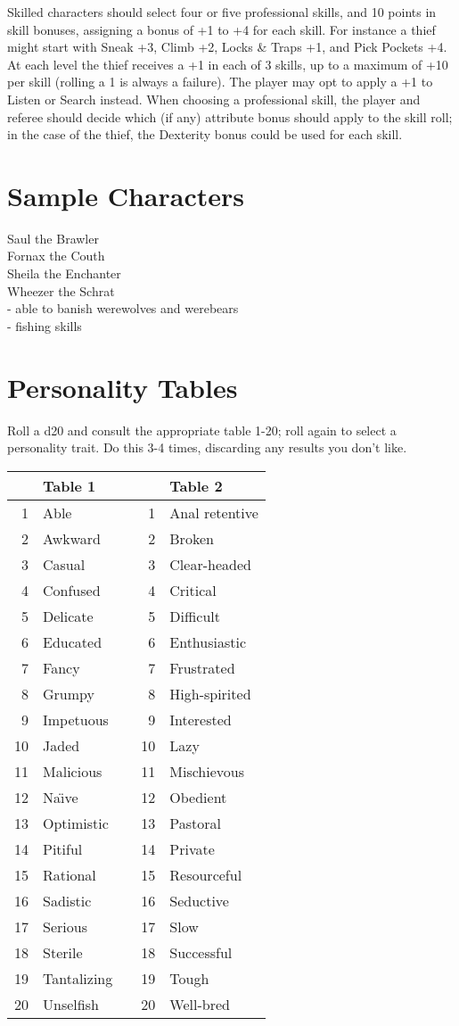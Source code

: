 \documentclass[12pt]{article}
\begin{document}
Skilled characters should select four or five professional skills, and
10 points in skill bonuses, assigning a bonus of +1 to +4 for each
skill. For instance a thief might start with Sneak +3, Climb +2, Locks
\& Traps +1, and Pick Pockets +4. At each level the thief receives a +1
in each of 3 skills, up to a maximum of +10 per skill (rolling a 1 is
always a failure). The player may opt to apply a +1 to Listen or
Search instead. When choosing a professional skill, the player and
referee should decide which (if any) attribute bonus should apply to
the skill roll; in the case of the thief, the Dexterity bonus could be
used for each skill.

\section{Sample Characters}
Saul the Brawler \\
Fornax the Couth \\
Sheila the Enchanter \\
Wheezer the Schrat \\
- able to banish werewolves and werebears \\
- fishing skills \\
\section{Personality Tables}
Roll a d20 and consult the appropriate table 1-20; roll again to
select a personality trait. Do this 3-4 times, discarding any results
you don't like.

\begin{tabular}{r|l l r|l}
 & Table 1 & & & Table 2 \\\hline
 1 & Able & &  1 & Anal retentive\\
 2 & Awkward & &  2 & Broken\\
 3 & Casual & &  3 & Clear-headed\\
 4 & Confused & &  4 & Critical\\
 5 & Delicate & &  5 & Difficult\\
 6 & Educated & &  6 & Enthusiastic\\
 7 & Fancy & &  7 & Frustrated\\
 8 & Grumpy & &  8 & High-spirited\\
 9 & Impetuous & &  9 & Interested\\
10 & Jaded & & 10 & Lazy\\
11 & Malicious & & 11 & Mischievous\\
12 & Na\"{\i}ve & & 12 & Obedient\\
13 & Optimistic & & 13 & Pastoral\\
14 & Pitiful & & 14 & Private\\
15 & Rational & & 15 & Resourceful\\
16 & Sadistic & & 16 & Seductive\\
17 & Serious & & 17 & Slow\\
18 & Sterile & & 18 & Successful\\
19 & Tantalizing & & 19 & Tough\\
20 & Unselfish & & 20 & Well-bred\\
\end{tabular}
\end{document}
